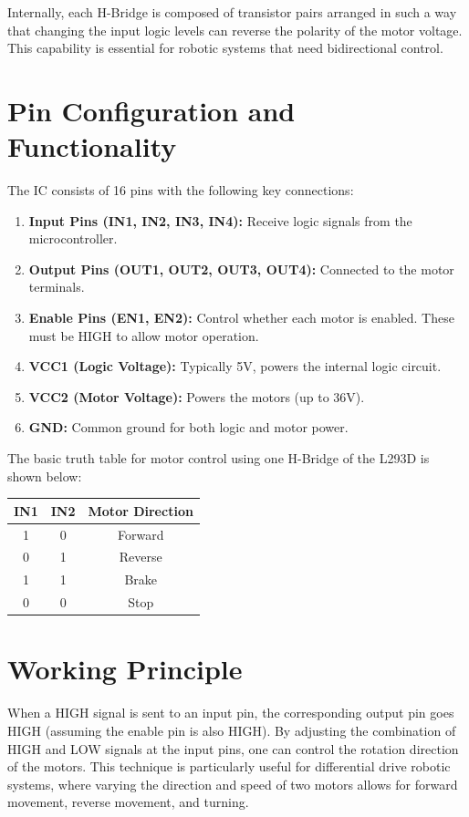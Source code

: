 \documentclass[a4paper,12pt]{article}
\begin{document}
	Internally, each H-Bridge is composed of transistor pairs arranged in such a way that changing the input logic levels can reverse the polarity of the motor voltage. This capability is essential for robotic systems that need bidirectional control.
	
	\section*{Pin Configuration and Functionality}
	
	The IC consists of 16 pins with the following key connections:
	
	\begin{enumerate}
		\item \textbf{Input Pins (IN1, IN2, IN3, IN4):} Receive logic signals from the microcontroller.
		\item \textbf{Output Pins (OUT1, OUT2, OUT3, OUT4):} Connected to the motor terminals.
		\item \textbf{Enable Pins (EN1, EN2):} Control whether each motor is enabled. These must be HIGH to allow motor operation.
		\item \textbf{VCC1 (Logic Voltage):} Typically 5V, powers the internal logic circuit.
		\item \textbf{VCC2 (Motor Voltage):} Powers the motors (up to 36V).
		\item \textbf{GND:} Common ground for both logic and motor power.
	\end{enumerate}
	
	\noindent The basic truth table for motor control using one H-Bridge of the L293D is shown below:
	
	\begin{center}
		\begin{tabular}{|c|c|c|}
			\hline
			IN1 & IN2 & Motor Direction \\
			\hline
			1 & 0 & Forward \\
			0 & 1 & Reverse \\
			1 & 1 & Brake \\
			0 & 0 & Stop \\
			\hline
		\end{tabular}
	\end{center}
	
	\section*{Working Principle}
	
	When a HIGH signal is sent to an input pin, the corresponding output pin goes HIGH (assuming the enable pin is also HIGH). By adjusting the combination of HIGH and LOW signals at the input pins, one can control the rotation direction of the motors. This technique is particularly useful for differential drive robotic systems, where varying the direction and speed of two motors allows for forward movement, reverse movement, and turning.
	
\end{document}
